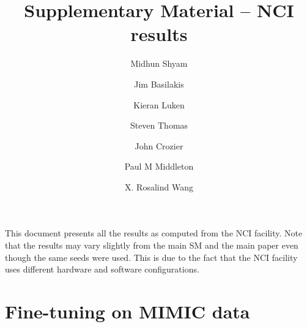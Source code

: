 \documentclass[a4paper,12pt]{article}
\title{Supplementary Material -- NCI results}
\author{Midhun Shyam\orcidlink{0009-0006-2930-2135} \and
Jim Basilakis\orcidlink{0000-0002-7440-1320} \and
Kieran Luken\orcidlink{0000-0002-6147-693X} \and
Steven Thomas\orcidlink{0000-0002-2416-0020} \and
John Crozier\orcidlink{0000-0002-4773-8518} \and
Paul M Middleton\orcidlink{0000-0003-0760-1098} \and
X. Rosalind Wang\orcidlink{0000-0001-5454-6197}}
\date{}
\begin{document}
\maketitle

This document presents all the results as computed from the NCI facility. Note that the results may vary slightly from the main SM and the main paper even though the same seeds were used. This is due to the fact that the NCI facility uses different hardware and software configurations.




\section{Fine-tuning on MIMIC data}
\end{document}
